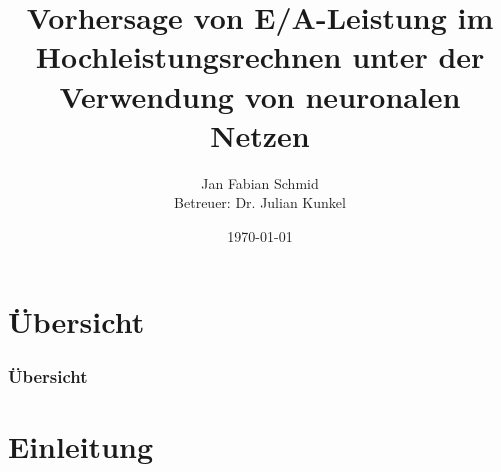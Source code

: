 \documentclass{beamer}
\title[E/A-Leistungsvorhersage im HPC]{Vorhersage von E/A-Leistung im Hochleistungsrechnen unter der Verwendung von neuronalen Netzen} %
\author[Jan Fabian Schmid]{Jan Fabian Schmid\\{\small Betreuer: Dr. Julian Kunkel}}
\institute[UHH] %
{
Universität Hamburg \\ %
\medskip
\textit{2schmid@informatik.uni-hamburg.de} %
}
\date{\today} %
\begin{document}
\begin{frame}
\titlepage %
\end{frame}

\section{Übersicht}
\begin{frame}
\frametitle{Übersicht} %
\tableofcontents %
\end{frame}


\section{Einleitung}
\end{document}
